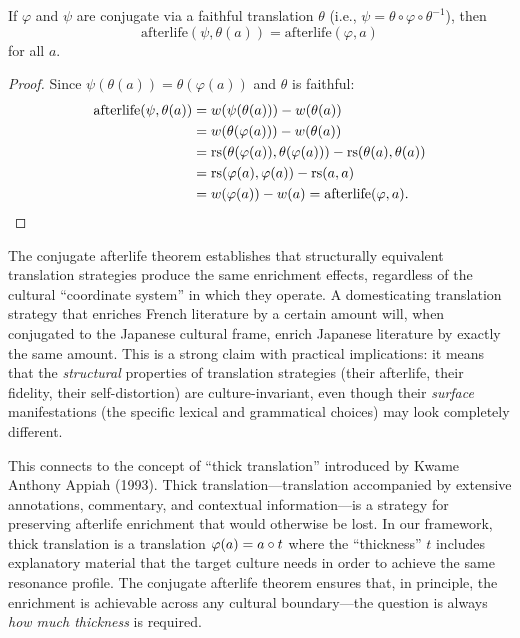 \begin{theorem}
\label{thm:conjugate-afterlife}
If $\varphi$ and $\psi$ are conjugate via a faithful translation $\theta$ (i.e., $\psi = \theta \circ \varphi \circ \theta^{-1}$), then
\[
  \mathrm{afterlife}(\psi, \theta(a)) = \mathrm{afterlife}(\varphi, a)
\]
for all $a$.
\end{theorem}

\begin{proof}
Since $\psi(\theta(a)) = \theta(\varphi(a))$ and $\theta$ is faithful:
\begin{align*}
  \mathrm{afterlife}(\psi, \theta(a)) &= w(\psi(\theta(a))) - w(\theta(a)) \\
  &= w(\theta(\varphi(a))) - w(\theta(a)) \\
  &= \mathrm{rs}(\theta(\varphi(a)), \theta(\varphi(a))) - \mathrm{rs}(\theta(a), \theta(a)) \\
  &= \mathrm{rs}(\varphi(a), \varphi(a)) - \mathrm{rs}(a, a) \\
  &= w(\varphi(a)) - w(a) = \mathrm{afterlife}(\varphi, a).
\end{align*}
\end{proof}

\begin{interpretation}
\label{interp:translation-strategies}
The conjugate afterlife theorem establishes that structurally equivalent translation strategies produce the same enrichment effects, regardless of the cultural ``coordinate system'' in which they operate.  A domesticating translation strategy that enriches French literature by a certain amount will, when conjugated to the Japanese cultural frame, enrich Japanese literature by exactly the same amount.  This is a strong claim with practical implications: it means that the \emph{structural} properties of translation strategies (their afterlife, their fidelity, their self-distortion) are culture-invariant, even though their \emph{surface} manifestations (the specific lexical and grammatical choices) may look completely different.

This connects to the concept of ``thick translation'' introduced by Kwame Anthony Appiah (1993).  Thick translation---translation accompanied by extensive annotations, commentary, and contextual information---is a strategy for preserving afterlife enrichment that would otherwise be lost.  In our framework, thick translation is a translation $\varphi(a) = a \circ t$ where the ``thickness'' $t$ includes explanatory material that the target culture needs in order to achieve the same resonance profile.  The conjugate afterlife theorem ensures that, in principle, the enrichment is achievable across any cultural boundary---the question is always \emph{how much thickness} is required.
\end{interpretation}


